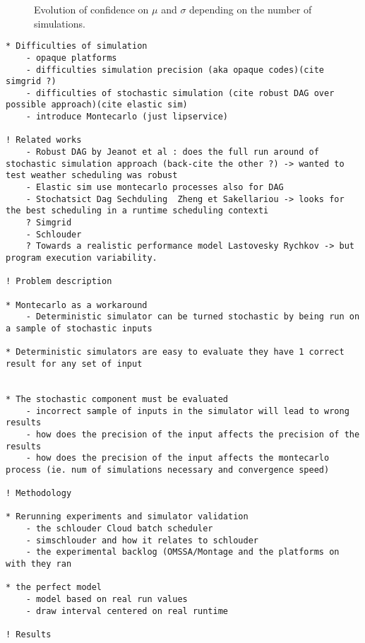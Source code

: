 \documentclass[10pt,conference,compsocconf]{IEEEtran}
\begin{document}
\begin{figure}
	\centering
	\resizebox{0.5\textwidth}{!}{%
		
	}
	\resizebox{0.5\textwidth}{!}{%
		
	}
	\caption{Evolution of confidence on $\mu$ and $\sigma$ depending on the
	number of simulations.}
	\label{fig:confidence}
\end{figure}






\newpage
\begin{verbatim}
* Difficulties of simulation
	- opaque platforms
	- difficulties simulation precision (aka opaque codes)(cite simgrid ?)
	- difficulties of stochastic simulation (cite robust DAG over possible approach)(cite elastic sim)
	- introduce Montecarlo (just lipservice)

! Related works
	- Robust DAG by Jeanot et al : does the full run around of stochastic simulation approach (back-cite the other ?) -> wanted to test weather scheduling was robust
	- Elastic sim use montecarlo processes also for DAG	
	- Stochatsict Dag Sechduling  Zheng et Sakellariou -> looks for the best scheduling in a runtime scheduling contexti
	? Simgrid
	- Schlouder
	? Towards a realistic performance model Lastovesky Rychkov -> but program execution variability.

! Problem description
	
* Montecarlo as a workaround 
	- Deterministic simulator can be turned stochastic by being run on a sample of stochastic inputs

* Deterministic simulators are easy to evaluate they have 1 correct result for any set of input 


* The stochastic component must be evaluated
	- incorrect sample of inputs in the simulator will lead to wrong results
	- how does the precision of the input affects the precision of the results
	- how does the precision of the input affects the montecarlo process (ie. num of simulations necessary and convergence speed)

! Methodology 

* Rerunning experiments and simulator validation
	- the schlouder Cloud batch scheduler
	- simschlouder and how it relates to schlouder
	- the experimental backlog (OMSSA/Montage and the platforms on with they ran

* the perfect model
	- model based on real run values
	- draw interval centered on real runtime

! Results
\end{verbatim}
\end{document}
